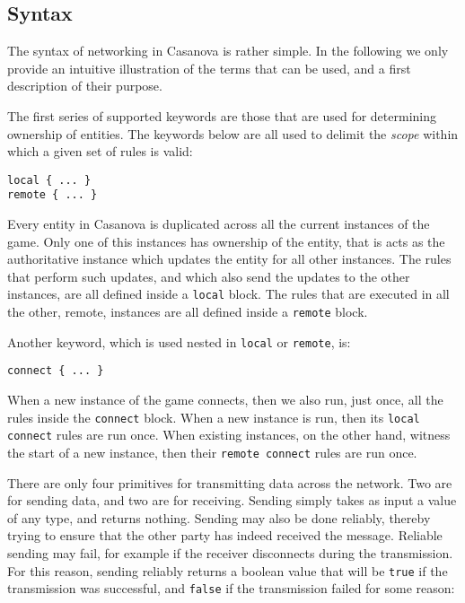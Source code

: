 \subsection{Syntax}
The syntax of networking in Casanova is rather simple. In the following we only provide an intuitive illustration of the terms that can be used, and a first description of their purpose.

The first series of supported keywords are those that are used for determining ownership of entities. The keywords below are all used to delimit the \textit{scope} within which a given set of rules is valid:

\begin{lstlisting}
local { ... }
remote { ... }
\end{lstlisting}

Every entity in Casanova is duplicated across all the current instances of the game. Only one of this instances has ownership of the entity, that is acts as the authoritative instance which updates the entity for all other instances. The rules that perform such updates, and which also send the updates to the other instances, are all defined inside a \texttt{local} block. The rules that are executed in all the other, remote, instances are all defined inside a \texttt{remote} block.

Another keyword, which is used nested in \texttt{local} or \texttt{remote}, is:

\begin{lstlisting}
connect { ... }
\end{lstlisting}

When a new instance of the game connects, then we also run, just once, all the rules inside the \texttt{connect} block. When a new instance is run, then its \texttt{local connect} rules are run once. When existing instances, on the other hand, witness the start of a new instance, then their \texttt{remote connect} rules are run once.

There are only four primitives for transmitting data across the network. Two are for sending data, and two are for receiving. Sending simply takes as input a value of any type, and returns nothing. Sending may also be done reliably, thereby trying to ensure that the other party has indeed received the message. Reliable sending may fail, for example if the receiver disconnects during the transmission. For this reason, sending reliably returns a boolean value that will be \texttt{true} if the transmission was successful, and \texttt{false} if the transmission failed for some reason:

